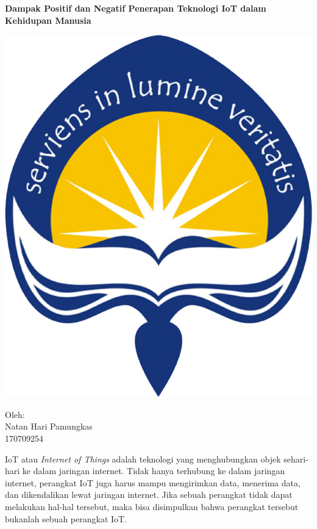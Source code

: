 \documentclass[12pt, letterpaper]{article}
\begin{document}
\begin{titlepage} 
  \begin{center}   
    \LARGE
    \textbf{Dampak Positif dan Negatif Penerapan Teknologi IoT dalam Kehidupan Manusia}
  \end{center}
  \begin{center}
    \vspace{1cm}
    \includegraphics[scale=6]{logo_uajy}
    \vspace{0.5cm}
  \end{center}
  \begin{center}
    \Large
    Oleh:\\
    Natan Hari Pamungkas\\
    170709254
  \end{center}
\end{titlepage}

\setlength{\parindent}{4ex}
IoT atau \textit{Internet of Things} adalah teknologi yang menghubungkan objek sehari-hari ke dalam jaringan internet.\cite{techtarget20} Tidak hanya terhubung ke dalam jaringan internet, perangkat IoT juga harus mampu mengirimkan data, menerima data, dan dikendalikan lewat jaringan internet. Jika sebuah perangkat tidak dapat melakukan hal-hal tersebut, maka bisa disimpulkan bahwa perangkat tersebut bukanlah sebuah perangkat IoT.
\end{document}
